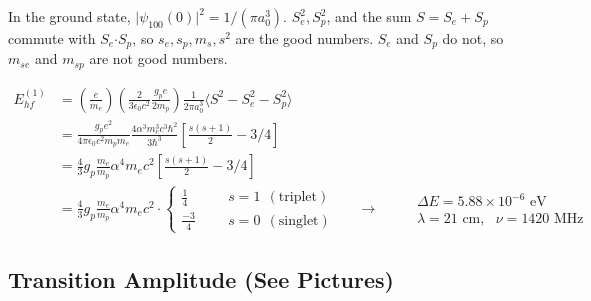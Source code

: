 \documentclass[12pt]{article}
\newcommand{\dotP}{\boldsymbol \cdot}		%
\begin{document}
\vspace{20pt} \noindent
In the ground state, \(\big| \psi_{100}(0) \big|^2 = 1/(\pi a_0^3)\). \(S_e^2, S_p^2\), and the 
sum \(S=S_e + S_p\) commute with \(S_e \dotP S_p\), so \(s_e, s_p, m_s, s^2\) are the good numbers.
\(S_e\) and \(S_p\) do not, so \(m_{se}\) and \(m_{sp}\) are not good numbers.

\vspace{20pt}
\(\begin{aligned}
    E^{(1)}_{hf} &= \left(\frac{e}{m_e} \right) \left( \frac{2}{3\epsilon_0 c^2} \frac{g_p e}{2m_p} \right) 
        \frac{1}{2 \pi a_0^3} \langle S^2 - S^2_e - S^2_p \rangle \\[5pt]
    &= \frac{g_p e^2}{4 \pi \epsilon_0 c^2 m_p m_e} 
        \frac{4 \alpha^3 m_e^3 c^3 \hbar^2 }{3 \hbar^3} \left[ \frac{s(s+1)}{2} - 3/4 \right]\\[5pt]
    &= \frac{4}{3} g_p \frac{m_e}{m_p} \alpha^4 m_e c^2 \left[ \frac{s(s+1)}{2} - 3/4 \right]\\[5pt]
    &= \frac{4}{3} g_p \frac{m_e}{m_p} \alpha^4 m_e c^2 \cdot 
        \begin{cases}
            \frac{1}{4}     &   \hspace{18pt} s=1 \ \ (\text{triplet})\\
            \frac{-3}{4}    &   \hspace{18pt} s=0 \ \ (\text{singlet})
        \end{cases} \hspace{18pt} \rightarrow \hspace{18pt} \begin{aligned}
            &\Delta E = 5.88 \times 10^{-6} \text{\ eV} \\[5pt]
            &\lambda = 21 \text{\ cm}, \ \ \ \nu = 1420 \text{\ MHz}
        \end{aligned}
\end{aligned}\)

%
%
\newpage
\subsection{Transition Amplitude (See Pictures)}
\end{document}
